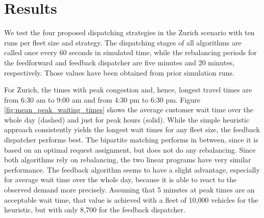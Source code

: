 \section{Results}
\label{sec:results}

We test the four proposed dispatching strategies in the Zurich scenario with ten
runs per fleet size and strategy. The dispatching stages of all algorithms are called once every 60 seconds in
simulated time, while the rebalancing periods for the feedforward and feedback
dispatcher are five minutes and 20 minutes, respectively. Those values have been
obtained from prior simulation runs.

For Zurich, the times with peak congestion and, hence, longest travel times
are from 6:30 am to 9:00 am and from 4:30 pm to 6:30 pm. Figure \ref{fig:mean_peak_waiting_times}
shows the average customer wait time over the whole day (dashed) and just for peak hours (solid).
While the simple heuristic approach consistently yields the longest wait times
for any fleet size, the feedback dispatcher performs best. The bipartite matching
performs in between, since it is based on an optimal request assignment, but does
not do any rebalancing. Since both algorithms rely on rebalancing, the two linear
programs have very similar performance. The feedback algorithm seems to have a
slight advantage, especially for average wait time over the whole day, because it
is able to react to the observed demand more precisely. Assuming that 5 minutes at
peak times are an acceptable wait time, that value is
achieved with a fleet of 10,000 vehicles for the heuristic, but with only 8,700
for the feedback dispatcher.

\captionsetup[subfigure]{width=0.9\textwidth}

